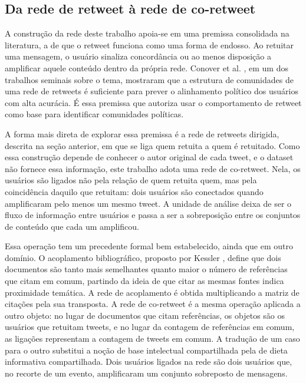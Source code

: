 \documentclass[conference]{IEEEtran}
\begin{document}
\subsection{Da rede de retweet à rede de co-retweet}
\label{sub:coretweet}
A construção da rede deste trabalho apoia-se em uma premissa consolidada na literatura, a de que o retweet funciona como uma forma de endosso. Ao retuitar uma mensagem, o usuário sinaliza concordância ou ao menos disposição a amplificar aquele conteúdo dentro da própria rede. Conover et al. \cite{b_conover2011}, em um dos trabalhos seminais sobre o tema, mostraram que a estrutura de comunidades de uma rede de retweets é suficiente para prever o alinhamento político dos usuários com alta acurácia. É essa premissa que autoriza usar o comportamento de retweet como base para identificar comunidades políticas.

A forma mais direta de explorar essa premissa é a rede de retweets dirigida, descrita na seção anterior, em que se liga quem retuita a quem é retuitado. Como essa construção depende de conhecer o autor original de cada tweet, e o dataset não fornece essa informação, este trabalho adota uma rede de co-retweet. Nela, os usuários são ligados não pela relação de quem retuita quem, mas pela coincidência daquilo que retuitam: dois usuários são conectados quando amplificaram pelo menos um mesmo tweet. A unidade de análise deixa de ser o fluxo de informação entre usuários e passa a ser a sobreposição entre os conjuntos de conteúdo que cada um amplificou.

Essa operação tem um precedente formal bem estabelecido, ainda que em outro domínio. O acoplamento bibliográfico, proposto por Kessler \cite{b_kessler1963}, define que dois documentos são tanto mais semelhantes quanto maior o número de referências que citam em comum, partindo da ideia de que citar as mesmas fontes indica proximidade temática. A rede de acoplamento é obtida multiplicando a matriz de citações pela sua transposta. A rede de co-retweet é a mesma operação aplicada a outro objeto: no lugar de documentos que citam referências, os objetos são os usuários que retuitam tweets, e no lugar da contagem de referências em comum, as ligações representam a contagem de tweets em comum. A tradução de um caso para o outro substitui a noção de base intelectual compartilhada pela de dieta informativa compartilhada. Dois usuários ligados na rede são dois usuários que, no recorte de um evento, amplificaram um conjunto sobreposto de mensagens.
\end{document}

